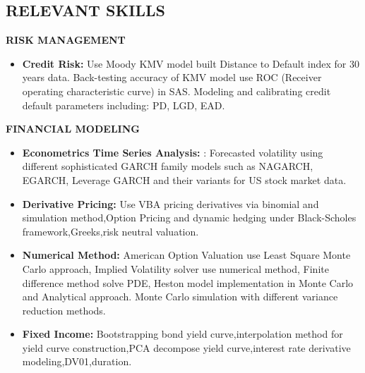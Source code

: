 \documentclass{res}
\begin{document}
\begin{resume}
\section{RELEVANT  SKILLS}
{\bf RISK MANAGEMENT}
\begin{itemize}
\item{\bf Credit Risk:} Use Moody KMV model built Distance to Default index for 30 years data. Back-testing accuracy of KMV model use ROC (Receiver operating characteristic curve) in SAS. Modeling and calibrating credit default parameters including: PD, LGD, EAD.
 \end{itemize}
\vspace{-5pt}
{\bf FINANCIAL MODELING}
\begin{itemize}
\item {\bf Econometrics Time Series Analysis:} : Forecasted volatility using different sophisticated GARCH family models such as NAGARCH, EGARCH, Leverage GARCH and their variants for US stock market data.
\item {\bf Derivative Pricing:} Use VBA pricing derivatives via binomial and simulation method,Option Pricing and dynamic hedging under Black-Scholes framework,Greeks,risk neutral valuation.
\item {\bf Numerical Method:} American Option Valuation use Least Square Monte Carlo approach, Implied Volatility solver use numerical method, Finite difference method solve PDE, Heston model implementation in Monte Carlo and Analytical approach. Monte Carlo simulation with different variance reduction methods.
\item {\bf Fixed Income:} Bootstrapping bond yield curve,interpolation method for yield curve construction,PCA
    decompose yield curve,interest rate derivative modeling,DV01,duration.
   \end{itemize}
\vspace{-5pt}

\end{resume}
\end{document}
